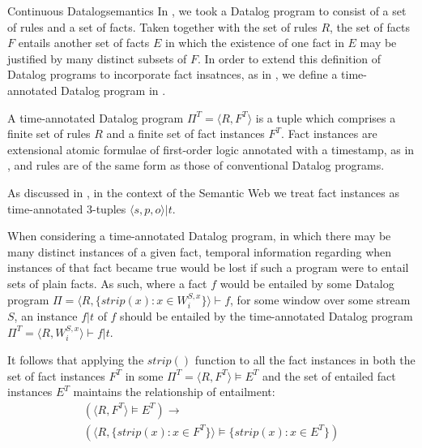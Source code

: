 \begin{nestedsection}{Continuous Datalog}{semantics}
In , we took a
Datalog program to consist of a set of rules and a set of facts.
Taken together with the set of rules $R$, the set of facts $F$ entails
another set of facts $E$ in which the existence of one fact in $E$ may
be justified by many distinct subsets of $F$. In order to extend this
definition of Datalog programs to incorporate fact insatnces,
as in , we define a
time-annotated Datalog program in .

\begin{definition}
A time-annotated Datalog program $\Pi^T = \langle R, F^T\rangle$ is a tuple
which comprises a finite set of rules $R$ and a finite set of fact instances
$F^T$. Fact instances are extensional atomic formulae of first-order logic
annotated with a timestamp, as in ,
and rules are of the same form as those of conventional Datalog programs.

As discussed in ,
in the context of the Semantic Web we treat fact instances as time-annotated
3-tuples ${\langle s, p, o \rangle | t}$.
\end{definition}

When considering a time-annotated Datalog program, in which there may be
many distinct instances of a given fact, temporal information regarding when
instances of that fact became true would be lost if such a program were to entail
sets of plain facts. As such, where a fact $f$ would be entailed by some Datalog
program ${\Pi = \langle R, \{ strip(x) : x \in W^{S,x}_i \} \rangle \vdash f}$,
for some window over some stream $S$, an instance ${f | t}$ of $f$ should be
entailed by the time-annotated Datalog program
${\Pi^T = \langle R, W^{S,x}_i \rangle \vdash f | t}$.

It follows that applying the ${strip()}$ function to all the fact instances in
both the set of fact instances $F^T$ in some ${\Pi^T = \langle R, F^T \rangle \vDash E^T}$
and the set of entailed fact instances $E^T$ maintains the relationship of entailment:
\begin{multline*}
	\left( \langle R, F^T \rangle \vDash E^T \right) \rightarrow \\
		\left( \langle R, \{ strip(x) : x \in F^T \} \rangle \vDash \{ strip(x) : x \in E^T \} \right)
\end{multline*}


\end{nestedsection}
